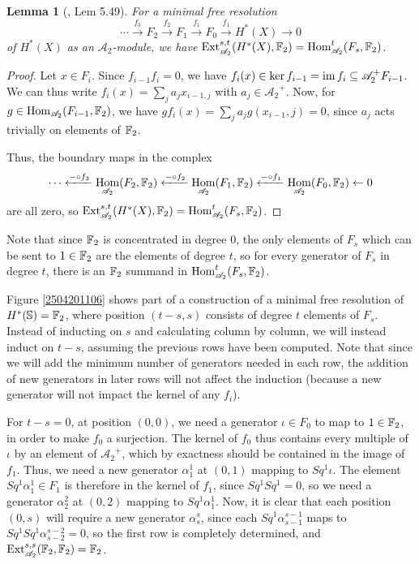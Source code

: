 \documentclass[11pt, titlepage]{article} %
\def\bb{\ensuremath\mathbb}
\def\subq{\ensuremath\subseteq}
\def\A{\ensuremath{\mathscr{A}_2}}
\DeclareMathOperator{\Ext}{Ext}
\DeclareMathOperator{\Hom}{Hom}
\DeclareMathOperator{\im}{im}
\numberwithin{equation}{subsection}
\theoremstyle{plain}
\newtheorem{lemma}[theorem]{Lemma}
\theoremstyle{definition}
\begin{document}
\begin{lemma}[{\autocite{hatcher5}, Lem 5.49}]\label{2503171645shutupitsbeenalongterm}
For a minimal free resolution 
\[\cdots \xrightarrow{f_3} F_2 \xrightarrow{f_2} F_1 \xrightarrow{f_1} F_0 \xrightarrow{f_1} H^*(X) \to 0\]
of \(H^*(X)\) as an \(\A\)-module, we have \(\Ext_{\A}^{s,t}(H^*(X), \bb{F}_2)=\Hom^t_{\A}(F_s, \bb{F}_2)\).
\end{lemma}

\begin{proof}
Let \(x \in F_i\). Since \(f_{i-1}f_i=0\), we have \(f_i(x)\in \ker f_{i-1}=\im f_i\subq \A^+F_{i-1}\). We can thus write \(f_i(x)=\sum_j a_j x_{i-1,j}\) with \(a_j \in \A^+\). Now, for \(g \in \Hom_{\A}(F_{i-1}, \bb{F}_2)\), we have \(gf_i(x)=\sum_j a_j g(x_{i-1},j)=0\), since \(a_j\) acts trivially on elements of \(\bb{F}_2\). 

Thus, the boundary maps in the complex
\[\cdots \xleftarrow{-\circ f_3}\Hom_{\A}(F_2, \bb{F}_2) \xleftarrow{-\circ f_2}\Hom_{\A}(F_1, \bb{F}_2) \xleftarrow{-\circ f_1} \Hom_{\A}(F_0, \bb{F}_2)\leftarrow 0\]
are all zero, so \(\Ext_{\A}^{s,t}(H^*(X), \bb{F}_2)=\Hom^t_{\A}(F_s, \bb{F}_2)\).
\end{proof}

Note that since \(\bb{F}_2\) is concentrated in degree 0, the only elements of \(F_s\) which can be sent to \(1 \in \bb{F}_2\) are the elements of degree \(t\), so for every generator of \(F_s\) in degree \(t\), there is an \(\bb{F}_2\) summand in \(\Hom^t_{\A}(F_s, \bb{F}_2)\). 

Figure \ref{2504201106} shows part of a construction of a minimal free resolution of \(H^*(\bb{S})=\bb{F}_2\), where position \((t-s, s)\) consists of degree \(t\) elements of \(F_s\).  Instead of inducting on \(s\) and calculating column by column, we will instead induct on \(t-s\), assuming the previous rows have been computed. Note that since we will add the minimum number of generators needed in each row, the addition of new generators in later rows will not affect the induction (because a new generator will not impact the kernel of any \(f_i\)). 

For \(t-s=0\), at position \((0,0)\), we need a generator \(\iota\in F_0\) to map to \(1 \in \bb{F}_2\), in order to make \(f_0\) a surjection. The kernel of \(f_0\) thus contains every multiple of \(\iota\) by an element of \(\A^+\), which by exactness should be contained in the image of \(f_1\). Thus, we need a new generator \(\alpha^1_1\) at \((0,1)\) mapping to \(Sq^1\iota\). The element \(Sq^1\alpha^1_1\in F_1\) is therefore in the kernel of \(f_1\), since \(Sq^1Sq^1=0\), so we need a generator \(\alpha^2_2\) at \((0,2)\) mapping to \(Sq^1\alpha^1_1\). Now, it is clear that each position \((0,s)\) will require a new generator \(\alpha^s_s\), since each \(Sq^1\alpha^{s-1}_{s-1}\) maps to \(Sq^1Sq^1 \alpha^{s-2}_{s-2}=0\), so the first row is completely determined, and \(\Ext^{s,s}_{\A}(\bb{F}_2, \bb{F}_2)=\bb{F}_2\). 
\end{document}
